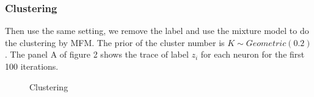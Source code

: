 \documentclass{article}
\begin{document}
	\subsubsection{Clustering}
	
	Then use the same setting, we remove the label and use the mixture model to do the clustering by MFM. The prior of the cluster number is $K\sim Geometric(0.2)$. The panel A of figure 2 shows the trace of label $z_i$ for each neuron for the first 100 iterations.
	
	\begin{figure}[h!]
		\centering
		
		\caption{Clustering}
	\end{figure}	
	
\end{document}
